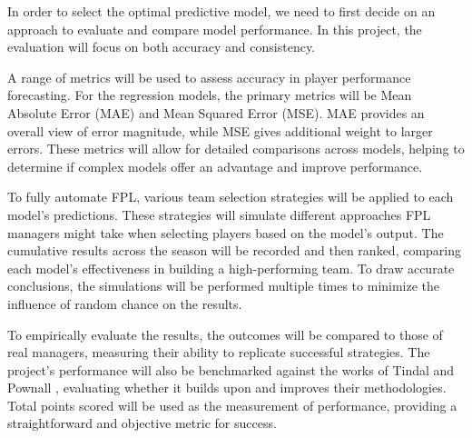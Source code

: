 In order to select the optimal predictive model, we need to first decide on an approach to evaluate and compare model performance. In this project, the evaluation will focus on both accuracy and consistency.

A range of metrics will be used to assess accuracy in player performance forecasting. For the regression models, the primary metrics will be Mean Absolute Error (MAE) and Mean Squared Error (MSE). MAE provides an overall view of error magnitude, while MSE gives additional weight to larger errors. These metrics will allow for detailed comparisons across models, helping to determine if complex models offer an advantage and improve performance.

To fully automate FPL, various team selection strategies will be applied to each model's predictions. These strategies will simulate different approaches FPL managers might take when selecting players based on the model’s output. The cumulative results across the season will be recorded and then ranked, comparing each model’s effectiveness in building a high-performing team. To draw accurate conclusions, the simulations will be performed multiple times to minimize the influence of random chance on the results. 

To empirically evaluate the results, the outcomes will be compared to those of real managers, measuring their ability to replicate successful strategies. The project’s performance will also be benchmarked against the works of Tindal \cite{tindal2023fantasyfootball} and Pownall \cite{pownall2023fantasyfootball}, evaluating whether it builds upon and improves their methodologies. Total points scored will be used as the measurement of performance, providing a straightforward and objective metric for success.
